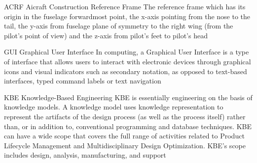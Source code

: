 %
%



  {ACRF}            %
  {Aicraft Construction Reference Frame}  %
  {The reference frame which has its origin in the fuselage forwardmost point, the x-axis pointing from the nose to the tail, the y-axis from fuselage plane of symmetry to the right wing (from the pilot's point of view) and the z-axis from pilot's feet to pilot's head} %



%
  {GUI}            %
  {Graphical User Interface}  %
  {In computing, a Graphical User Interface is a type of interface that allows users to interact with electronic devices through graphical icons and visual indicators such as secondary notation, as opposed to text-based interfaces, typed command labels or text navigation}


  {KBE}            %
  {Knowledge-Based Engineering}  %
  {KBE is essentially engineering on the basis of knowledge models. A knowledge model uses knowledge representation to represent the artifacts of the design process (as well as the process itself) rather than, or in addition to, conventional programming and database techniques. KBE can have a wide scope that covers the full range of activities related to Product Lifecycle Management and Multidisciplinary Design Optimization. KBE's scope includes design, analysis, manufacturing, and support} %

